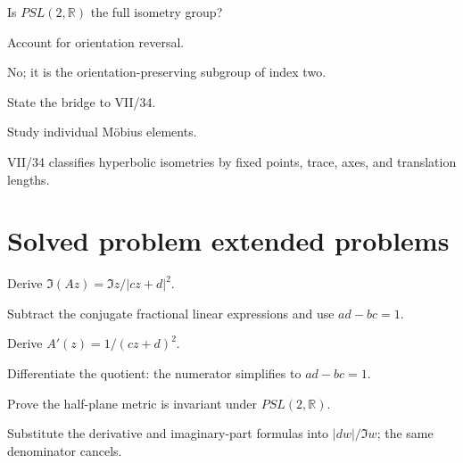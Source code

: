 \begin{exercise}\label{exr:vii33-23}
Is \(PSL(2,\mathbb R)\) the full isometry group?
\end{exercise}
\begin{hint}
Account for orientation reversal.
\end{hint}
\begin{solution}
No; it is the orientation-preserving subgroup of index two.
\end{solution}

\begin{exercise}\label{exr:vii33-24}
State the bridge to VII/34.
\end{exercise}
\begin{hint}
Study individual Möbius elements.
\end{hint}
\begin{solution}
VII/34 classifies hyperbolic isometries by fixed points, trace, axes, and translation lengths.
\end{solution}

\section{Solved problem extended problems}
\begin{problem}\label{prob:vii33-01}
Derive \(\Im(Az)=\Im z/|cz+d|^2\).
\end{problem}
\begin{solution}
Subtract the conjugate fractional linear expressions and use \(ad-bc=1\).
\end{solution}

\begin{problem}\label{prob:vii33-02}
Derive \(A'(z)=1/(cz+d)^2\).
\end{problem}
\begin{solution}
Differentiate the quotient: the numerator simplifies to \(ad-bc=1\).
\end{solution}

\begin{problem}\label{prob:vii33-03}
Prove the half-plane metric is invariant under \(PSL(2,\mathbb R)\).
\end{problem}
\begin{solution}
Substitute the derivative and imaginary-part formulas into \(|dw|/\Im w\); the same denominator cancels.
\end{solution}

